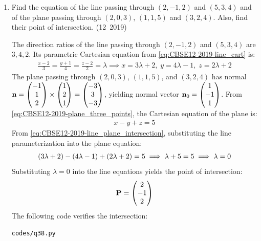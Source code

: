 \begin{enumerate}[label=\thesubsection.\arabic*, ref=\thesubsection.\theenumi]
\item Find the equation of the line passing through $(2,-1,2)$ and $(5,3,4)$ and of the plane passing through $(2,0,3)$, $(1,1,5)$ and $(3,2,4)$. Also, find their point of intersection.
\hfill (12~2019)

\solution
The direction ratios of the line passing through $(2, -1, 2)$ and $(5, 3, 4)$ are $3, 4, 2$. Its parametric Cartesian equation from \eqref{eq:CBSE12-2019-line_cart} is:
\begin{align}
	\frac{x - 2}{3} = \frac{y + 1}{4} = \frac{z - 2}{2} = \lambda \implies x = 3\lambda + 2, \; y = 4\lambda - 1, \; z = 2\lambda + 2
\end{align}
The plane passing through $(2, 0, 3)$, $(1, 1, 5)$, and $(3, 2, 4)$ has normal $\mathbf{n} = \begin{pmatrix}-1 \\ 1 \\ 2\end{pmatrix} \times \begin{pmatrix}1 \\ 2 \\ 1\end{pmatrix} = \begin{pmatrix}-3 \\ 3 \\ -3\end{pmatrix}$, yielding normal vector $\mathbf{n}_0 = \begin{pmatrix}1 \\ -1 \\ 1\end{pmatrix}$.
From \eqref{eq:CBSE12-2019-plane_three_points}, the Cartesian equation of the plane is:
\begin{align}
	x - y + z = 5
\end{align}
From \eqref{eq:CBSE12-2019-line_plane_intersection}, substituting the line parameterization into the plane equation:
\begin{align}
	\left(3\lambda + 2\right) - \left(4\lambda - 1\right) + \left(2\lambda + 2\right) = 5 \implies \lambda + 5 = 5 \implies \lambda = 0
\end{align}
Substituting $\lambda = 0$ into the line equations yields the point of intersection:
\begin{align}
	\mathbf{P} = \begin{pmatrix}2 \\ -1 \\ 2\end{pmatrix}
\end{align}
The following code verifies the intersection:
\begin{lstlisting}[frame=single, basicstyle=\ttfamily\small]
	codes/q38.py
\end{lstlisting}

\end{enumerate}



